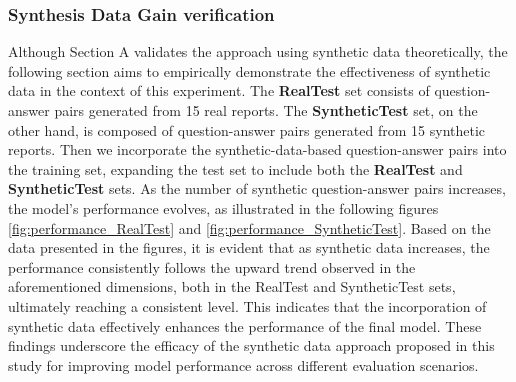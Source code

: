 \documentclass[preprint,12pt]{elsarticle}
\begin{document}
\subsubsection{Synthesis Data Gain verification}
Although Section A validates the approach using synthetic data theoretically, the following section aims to empirically demonstrate the effectiveness of synthetic data in the context of this experiment. The \textbf{RealTest} set consists of question-answer pairs generated from 15 real reports. The \textbf{SyntheticTest} set, on the other hand, is composed of question-answer pairs generated from 15 synthetic reports. Then we incorporate the synthetic-data-based question-answer pairs into the training set, expanding the test set to include both the \textbf{RealTest} and \textbf{SyntheticTest} sets. As the number of synthetic question-answer pairs increases, the model's performance evolves, as illustrated in the following figures  \ref{fig:performance_RealTest} and \ref{fig:performance_SyntheticTest}. Based on the data presented in the figures, it is evident that as synthetic data increases, the performance consistently follows the upward trend observed in the aforementioned dimensions, both in the RealTest and SyntheticTest sets, ultimately reaching a consistent level. This indicates that the incorporation of synthetic data effectively enhances the performance of the final model. These findings underscore the efficacy of the synthetic data approach proposed in this study for improving model performance across different evaluation scenarios. 
\end{document}

